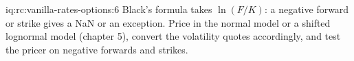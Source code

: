 \begin{solution}{iq:rc:vanilla-rates-options:6}
Black's formula takes $\ln(F/K)$: a negative forward or strike gives a NaN or
an exception. Price in the normal model or a shifted lognormal model (chapter
5), convert the volatility quotes accordingly, and test the pricer on negative
forwards and strikes.
\end{solution}
